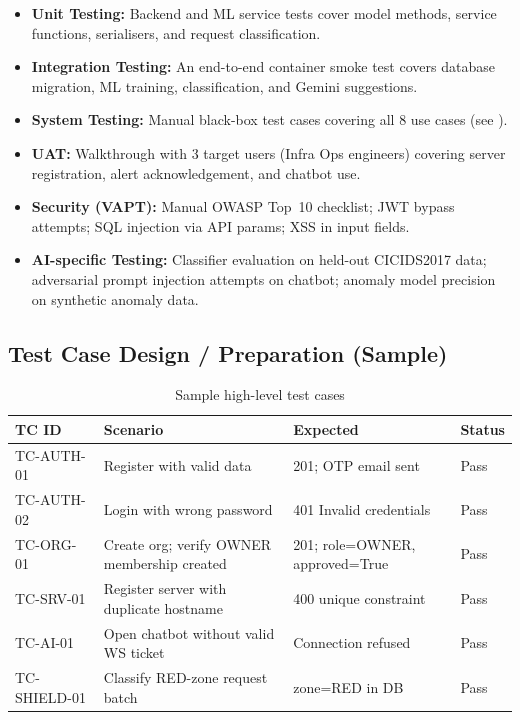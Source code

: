 \begin{itemize}
  \item \textbf{Unit Testing:} Backend and ML service tests cover model methods,
        service functions, serialisers, and request classification.
  \item \textbf{Integration Testing:} An end-to-end container smoke test covers
        database migration, ML training, classification, and Gemini suggestions.
  \item \textbf{System Testing:} Manual black-box test cases covering all 8
        use cases (see ).
  \item \textbf{UAT:} Walkthrough with 3 target users (Infra Ops engineers)
        covering server registration, alert acknowledgement, and chatbot use.
  \item \textbf{Security (VAPT):} Manual OWASP Top~10 checklist; JWT
        bypass attempts; SQL injection via API params; XSS in input fields.
  \item \textbf{AI-specific Testing:} Classifier evaluation on held-out
        CICIDS2017 data; adversarial prompt injection attempts on chatbot;
        anomaly model precision on synthetic anomaly data.
\end{itemize}

\subsection{Test Case Design / Preparation (Sample)}

\begin{table}[H]
\centering
\caption{Sample high-level test cases}\label{tab:tc_sample}
\small
\begin{tabularx}{\textwidth}{@{}l X l l@{}}
\toprule
\textbf{TC ID} & \textbf{Scenario} & \textbf{Expected} & \textbf{Status}\\
\midrule
TC-AUTH-01 & Register with valid data & 201; OTP email sent & Pass\\
TC-AUTH-02 & Login with wrong password & 401 Invalid credentials & Pass\\
TC-ORG-01  & Create org; verify OWNER membership created & 201; role=OWNER, approved=True & Pass\\
TC-SRV-01  & Register server with duplicate hostname & 400 unique constraint & Pass\\
TC-AI-01   & Open chatbot without valid WS ticket & Connection refused & Pass\\
TC-SHIELD-01 & Classify RED-zone request batch & zone=RED in DB & Pass\\
\bottomrule
\end{tabularx}
\end{table}

